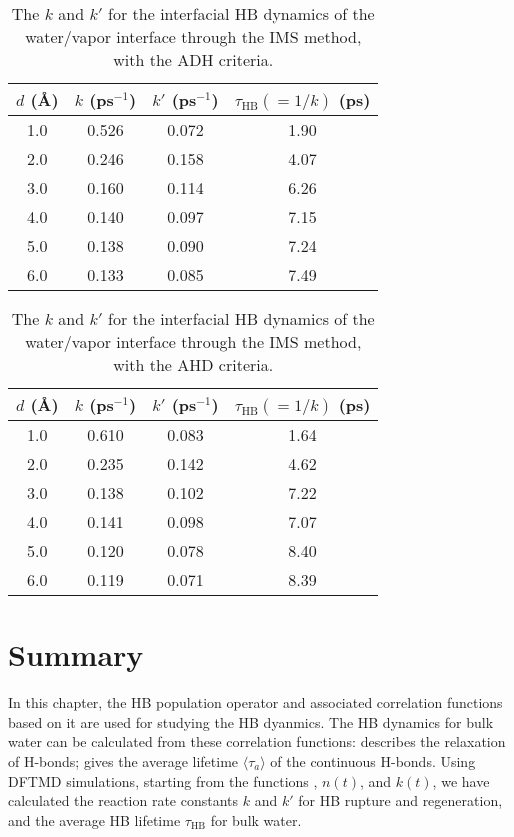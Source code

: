 \begin{table}[H]
\centering
\caption{\label{tab:k_k_prime_tau_128w_pure_ihb_scheme1_ADH} 
    The $k$ and $k'$ for the interfacial HB dynamics of the water/vapor interface through the IMS method, with the ADH criteria.} 
\begin{tabular}{cccc}
 $d$ (\AA) & $k$ (ps$^{-1}$) & $k'$ (ps$^{-1}$) & $\tau_{\text{HB}} (=1/k)$ (ps) \\
\hline
  1.0 & 0.526 & 0.072 & 1.90  \\
  2.0 & 0.246 & 0.158 & 4.07  \\
  3.0 & 0.160 & 0.114 & 6.26  \\
  4.0 & 0.140 & 0.097 & 7.15  \\
  5.0 & 0.138 & 0.090 & 7.24  \\
  6.0 & 0.133 & 0.085 & 7.49  \\
\end{tabular}
\end{table}
\begin{table}[H]
\centering
\caption{\label{tab:k_k_prime_tau_128w_pure_ihb_AHD} 
    The $k$ and $k'$ for the interfacial HB dynamics of the water/vapor interface through the IMS method, with the AHD criteria.} 
\begin{tabular}{cccc}
 $d$ (\AA) & $k$ (ps$^{-1}$) & $k'$ (ps$^{-1}$) & $\tau_{\text{HB}} (=1/k)$ (ps) \\
\hline
  1.0 & 0.610 & 0.083 & 1.64  \\
  2.0 & 0.235 & 0.142 & 4.62  \\
  3.0 & 0.138 & 0.102 & 7.22  \\
  4.0 & 0.141 & 0.098 & 7.07  \\
  5.0 & 0.120 & 0.078 & 8.40  \\
  6.0 & 0.119 & 0.071 & 8.39  \\
\end{tabular}
\end{table}

\section{Summary}
In this chapter, the HB population operator and associated correlation functions based on it are used for studying the HB dyanmics. 
The HB dynamics for bulk water can be calculated from these correlation functions: 
\CHB describes the relaxation of H-bonds; \SHB gives the average lifetime $\langle \tau_a \rangle$ of the continuous H-bonds. 
Using DFTMD simulations, starting from the functions \CHB, $n(t)$, and $k(t)$, 
we have calculated the reaction rate constants $k$ and $k'$ for HB rupture and regeneration, and the average HB lifetime $\tau_{\text{HB}}$ for bulk water.

